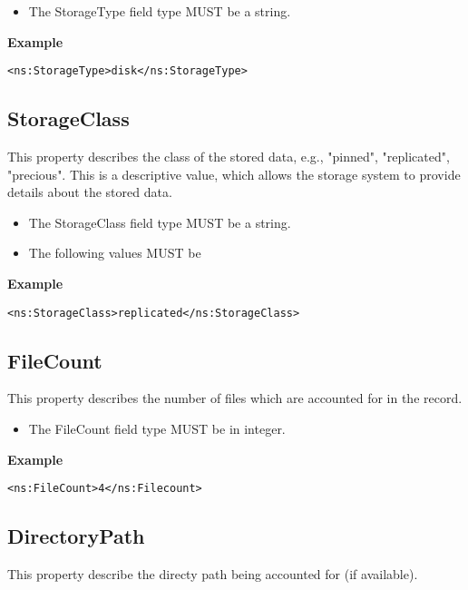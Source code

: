 \begin{itemize}
\item The StorageType field type MUST be a string.
\end{itemize}

{\bf Example}
\begin{verbatim}
<ns:StorageType>disk</ns:StorageType>
\end{verbatim}



\subsection{StorageClass}

This property describes the class of the stored data, e.g., "pinned",
"replicated", "precious". This is a descriptive value, which allows the storage
system to provide details about the stored data.

\begin{itemize}
\item The StorageClass field type MUST be a string.
\item The following values MUST be 
\end{itemize}

{\bf Example}
\begin{verbatim}
<ns:StorageClass>replicated</ns:StorageClass>
\end{verbatim}


\subsection{FileCount}

This property describes the number of files which are accounted for in the
record.

\begin{itemize}
\item The FileCount field type MUST be in integer.
\end{itemize}

{\bf Example}
\begin{verbatim}
<ns:FileCount>4</ns:Filecount>
\end{verbatim}



\subsection{DirectoryPath}

This property describe the directy path being accounted for (if available).

